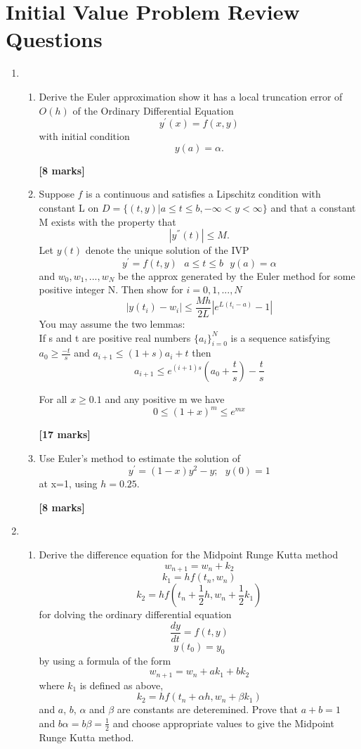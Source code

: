 
\section{Initial Value Problem Review Questions}
\begin{enumerate}
\item
\begin{enumerate}
\item
Derive the Euler approximation show it has a local truncation error of $O(h)$ of the Ordinary Differential Equation
\[y^{'}(x)=f(x,y) \]
with initial condition
\[y(a)=\alpha. \]
\begin{flushright}
\textbf{[8 marks]}
\end{flushright}
\item 
 Suppose $f$ is a continuous and satisfies a Lipschitz condition with constant
L on $D=\{(t,y)|a\leq t \leq b, -\infty < y < \infty \}$ and that a constant M
exists with the property that 
\[ |y^{''}(t)|\leq M. \]
Let $y(t)$ denote the unique solution of the IVP
\[ y^{'}=f(t,y) \ \ \ a\leq t \leq b \ \ \ y(a)=\alpha \]
and $w_0,w_1,...,w_N$ be the approx generated by the Euler method for some
positive integer N.  Then show for $i=0,1,...,N$
\[ |y(t_i)-w_i| \leq \frac{Mh}{2L}|e^{L(t_i-a)}-1| \]
You may assume the two lemmas:\\
If s and t are positive real numbers $\{a_i\}_{i=0}^{N}$ is a sequence satisfying $a_0 \geq \frac{-t}{s}$ and $a_{i+1} \leq (1+s)a_i +t $
then
\[a_{i+1} \leq e^{(i+1)s}\left(a_0+\frac{t}{s}\right)-\frac{t}{s} \]

For all $ x \geq 0.1$ and any positive m we have \[0\leq (1+x)^m \leq e^{mx}\]
\begin{flushright}
\textbf{[17 marks]}
\end{flushright}
\item
Use Euler's method to estimate the solution of
\[ y^{'}=(1-x)y^2-y; \ \ \ y(0)=1 \]
at x=1, using $h=0.25$.
\begin{flushright}
\textbf{[8 marks]}
\end{flushright}

\end{enumerate}
\item
\begin{enumerate}
\item
Derive the difference equation for the Midpoint Runge Kutta method\\
\[ w_{n+1}=w_n+k_2\]
\[k_1=hf(t_n,w_n)\]
\[k_2=hf(t_n+\frac{1}{2}h,w_n+\frac{1}{2}k_1)\]
for dolving the ordinary differential equation
\[ \frac{dy}{dt}=f(t,y) \]
\[y(t_0)=y_0 \]
by using a formula of the form
\[w_{n+1}=w_n+ak_1+bk_2 \]
where $k_1$ is defined as above,
\[k_2=hf(t_n+\alpha h,w_n+\beta k_1)\]
and $a$, $b$, $\alpha$ and $\beta$ are constants are deteremined. Prove that $a+b=1$ and $b\alpha=b\beta=\frac{1}{2}$ and choose appropriate values to give the Midpoint Runge Kutta method.


\end{enumerate}
\end{enumerate}
